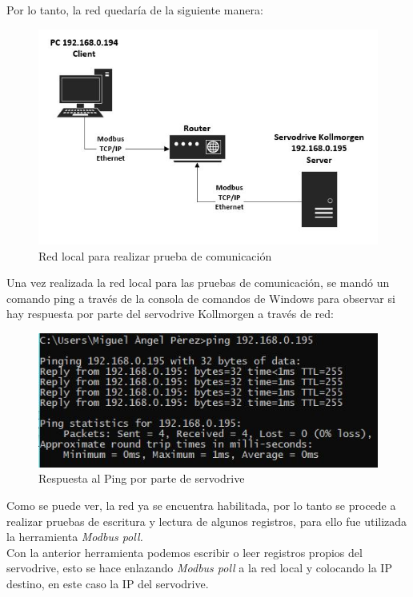 \documentclass[12pt,titlepage]{article}
\begin{document}
Por lo tanto, la red quedaría de la siguiente manera: \\
 \begin{figure}[htbp]
\hspace*{3.1cm} 
\includegraphics[scale=0.68]{prueba_modbus}
\caption{Red local para realizar prueba de comunicación}
\end{figure}
\newpage
Una vez realizada la red local para las pruebas de comunicación, se mandó un comando ping a través de la consola de comandos de Windows para observar si hay respuesta por parte del servodrive Kollmorgen a través de red: \\ 

 \begin{figure}[htbp]
\hspace*{3.2cm} 
\includegraphics[scale=0.88]{ping_test}
\caption{Respuesta al Ping por parte de servodrive}
\end{figure}

Como se puede ver, la red ya se encuentra habilitada, por lo tanto se procede a realizar pruebas de escritura y lectura de algunos registros, para ello fue utilizada la herramienta \textit{Modbus poll.}\\ 

Con la anterior herramienta podemos escribir o leer registros propios del servodrive, esto se hace enlazando \textit{Modbus poll} a la red local y colocando la IP destino, en este caso la IP del servodrive. \\ 
\end{document}
